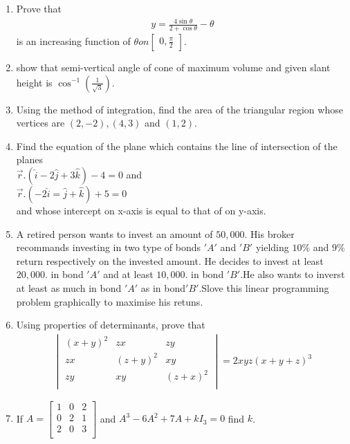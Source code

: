 \documentclass[12pt,-letter paper]{article}
\providecommand{\mydet}[1]{\ensuremath{\begin{vmatrix}#1\end{vmatrix}}}
\providecommand{\myvec}[1]{\ensuremath{\begin{bmatrix}#1\end{bmatrix}}}
\providecommand{\brak}[1]{\ensuremath{\left(#1\right)}}
\begin{document}
\begin{enumerate}
		  \item Prove that \begin{align*} y=\frac{4\sin{\theta}}{2+\cos    {\theta}}-\theta \end{align*} is an increasing function of $\theta on  \myvec{0,\frac{\pi}{2}}$.

			  \item  show that semi-vertical angle of cone of maximum volume and given slant height is  $\cos^{-1}\brak{\frac{1}{\sqrt{3}}}$.

			  \item Using the method of integration, find the area of the triangular region whose vertices are $\brak{2,-2}, \brak{4,3}$ and $\brak{1,2}$.

			  \item Find the equation of the plane which contains the line  of intersection of the planes\\                       $\overset{\rightarrow}{r}.\brak{\hat{i}-2\hat{j}+3\hat{k}}-4=0$ and \\ $\overset{\rightarrow}{r}.\brak{-2\hat{i}=\hat{j}+\hat{k}}+5=0$\\ and whose intercept on x-axis is equal to that of on y-axis.

			  \item A retired person wants to invest an amount of \rupee$50,000$. His broker recommands investing in two type of bonds $'A'$ and $'B'$ yielding $10\%$ and $9\%$ return respectively on the invested amount. He decides to invest at least\rupee$20,000$. in bond $'A'$ and at least \rupee$10,000$. in bond $'B'$.He also wants to inverst at least as much in bond $'A'$ as in bond$'B'$.Slove this linear programming problem graphically to maximise his retuns.


			  \item Using properties of determinants, prove that \begin{align*}\mydet{ \brak{x+y}^{2} & zx &  zy\\ zx & \brak{z+y}^{2} & xy    \\ zy & xy & \brak{z+x}^{2}\\}=2    xyz\brak{x+y+z}^{3} \end{align*}
    
           \item  If $A=\myvec{1 & 0 & 2 \\                                            0  & 2 & 1 \\                                         2 & 0 & 3 \\}$ and $A^3-6A^2+7A+kI_3=0$  find $k$.

 \end{enumerate}
    
\end{document}
